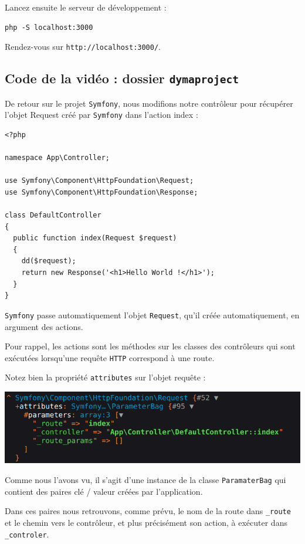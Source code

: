 \documentclass{article}
\begin{document}
Lancez ensuite le serveur de développement :
\begin{verbatim}
php -S localhost:3000
\end{verbatim}

Rendez-vous sur {\tt http://localhost:3000/}.

\subsection{Code de la vidéo : dossier {\tt dymaproject}}
De retour sur le projet {\tt Symfony}, nous modifions notre contrôleur pour récupérer l'objet Request créé par {\tt Symfony} dans l'action index :

\begin{verbatim}
<?php

namespace App\Controller;

use Symfony\Component\HttpFoundation\Request;
use Symfony\Component\HttpFoundation\Response;

class DefaultController
{
  public function index(Request $request)
  {
    dd($request);
    return new Response('<h1>Hello World !</h1>');
  }
}
\end{verbatim} 

{\tt Symfony} passe automatiquement l'objet {\tt Request}, qu'il créée automatiquement, en argument des actions.

Pour rappel, les actions sont les méthodes sur les classes des contrôleurs qui sont exécutées lorsqu'une requête {\tt HTTP} correspond à une route.

Notez bien la propriété {\tt attributes} sur l'objet requête :

\begin{center}
\includegraphics[width=15cm]{images/image8.png}
\end{center}

Comme nous l'avons vu, il s'agit d'une instance de la classe {\tt ParamaterBag} qui contient des paires clé / valeur créées par l'application.

Dans ces paires nous retrouvons, comme prévu, le nom de la route dans {\tt \_route} et le chemin vers le contrôleur, et plus précisément son action, à exécuter dans {\tt \_controler}.
\end{document}

